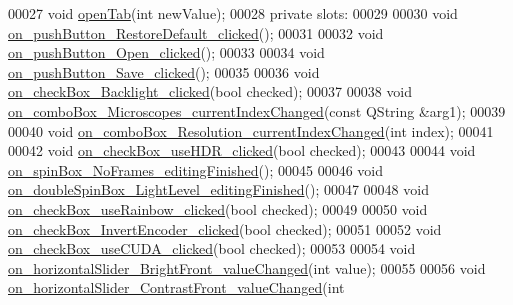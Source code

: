 \begin{DoxyCode}
00027   \textcolor{keywordtype}{void} \hyperlink{class_dialog_settings_ac22fca3a8ea77953fb667c0118860221}{openTab}(\textcolor{keywordtype}{int} newValue);
00028 \textcolor{keyword}{private} slots:
00029 
00030   \textcolor{keywordtype}{void} \hyperlink{class_dialog_settings_aae514236719c387d1922402298733660}{on\_pushButton\_RestoreDefault\_clicked}();
00031 
00032   \textcolor{keywordtype}{void} \hyperlink{class_dialog_settings_a46d3655796593684cd5949aeae57c6d5}{on\_pushButton\_Open\_clicked}();
00033 
00034   \textcolor{keywordtype}{void} \hyperlink{class_dialog_settings_a2f04e1b1d30db8197db4de03bea63a87}{on\_pushButton\_Save\_clicked}();
00035 
00036   \textcolor{keywordtype}{void} \hyperlink{class_dialog_settings_a32f4763290f97febfa34bcdcd2dc9432}{on\_checkBox\_Backlight\_clicked}(\textcolor{keywordtype}{bool} checked);
00037 
00038   \textcolor{keywordtype}{void} \hyperlink{class_dialog_settings_adeb3fcea2cf71899e5f9dd184421c131}{on\_comboBox\_Microscopes\_currentIndexChanged}(\textcolor{keyword}{const} QString
       &arg1);
00039 
00040   \textcolor{keywordtype}{void} \hyperlink{class_dialog_settings_a523a72d25bd4c7623cf8164cb73736d5}{on\_comboBox\_Resolution\_currentIndexChanged}(\textcolor{keywordtype}{int} index);
00041 
00042   \textcolor{keywordtype}{void} \hyperlink{class_dialog_settings_ae1c807192ce7c417cb7c742d7aa2a4c7}{on\_checkBox\_useHDR\_clicked}(\textcolor{keywordtype}{bool} checked);
00043 
00044   \textcolor{keywordtype}{void} \hyperlink{class_dialog_settings_ada2cc4ec4579282cd5045e3f77e99aeb}{on\_spinBox\_NoFrames\_editingFinished}();
00045 
00046   \textcolor{keywordtype}{void} \hyperlink{class_dialog_settings_a761f7eced4cbb72a9585dd2bc344a767}{on\_doubleSpinBox\_LightLevel\_editingFinished}();
00047 
00048   \textcolor{keywordtype}{void} \hyperlink{class_dialog_settings_a44848ea27b02c9c948e9a51beddd28a4}{on\_checkBox\_useRainbow\_clicked}(\textcolor{keywordtype}{bool} checked);
00049 
00050   \textcolor{keywordtype}{void} \hyperlink{class_dialog_settings_a77049e8a045e88d549648bf8a52d18b1}{on\_checkBox\_InvertEncoder\_clicked}(\textcolor{keywordtype}{bool} checked);
00051 
00052   \textcolor{keywordtype}{void} \hyperlink{class_dialog_settings_a621bee1594767554a084f331beff483a}{on\_checkBox\_useCUDA\_clicked}(\textcolor{keywordtype}{bool} checked);
00053 
00054   \textcolor{keywordtype}{void} \hyperlink{class_dialog_settings_af24b06407f4dc58ebe93979c91bedcbb}{on\_horizontalSlider\_BrightFront\_valueChanged}(\textcolor{keywordtype}{int} value);
00055 
00056   \textcolor{keywordtype}{void} \hyperlink{class_dialog_settings_a5932a6370c7314c3beeb37fb47292875}{on\_horizontalSlider\_ContrastFront\_valueChanged}(\textcolor{keywordtype}{int} 

\end{DoxyCode}
